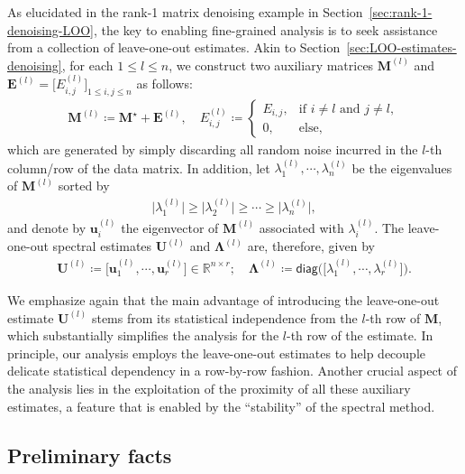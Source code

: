 As elucidated in the rank-1 matrix denoising example in Section~\ref{sec:rank-1-denoising-LOO}, the key to enabling fine-grained analysis is to seek assistance from  a collection of leave-one-out estimates.  Akin to Section~\ref{sec:LOO-estimates-denoising}, for each $1\leq l\leq n$, we construct  two auxiliary matrices  $\bm{M}^{(l)}$ and $\bm{E}^{(l)}=\big[E^{(l)}_{i,j} \big]_{1\leq i,j\leq n}$ as follows:
%
\begin{align}
\bm{M}^{(l)}\coloneqq\bm{M}^{\star}+\bm{E}^{(l)},
\quad
E_{i,j}^{(l)}  \coloneqq
\begin{cases}
E_{i,j}, & \text{if }i\neq l\text{ and }j\neq l,\\
0, & \text{else},
\end{cases}
\label{eq:Ml-construction-general}
\end{align}
%
which are generated by simply discarding all random noise incurred in the $l$-th column/row of the data matrix.
In addition, let $\lambda_1^{(l)},\cdots,\lambda_n^{(l)}$ be the eigenvalues of $\bm{M}^{(l)}$ sorted by
%
\begin{align}
	\big|\lambda_1^{(l)}\big| \geq \big|\lambda_2^{(l)}\big| \geq \cdots \geq \big| \lambda_{n}^{(l)} \big| ,
\end{align}
%
and denote by $\bm{u}_{i}^{(l)}$ the eigenvector of $\bm{M}^{(l)}$  associated with $\lambda_i^{(l)}$. The leave-one-out spectral estimates $\bm{U}^{(l)}$ and $\bm{\Lambda}^{(l)}$ are, therefore, given by
%
\begin{align}
	\bm{U}^{(l)}\coloneqq\big[\bm{u}_{1}^{(l)},\cdots,\bm{u}_{r}^{(l)}\big]\in\mathbb{R}^{n\times r};
	\quad
	\bm{\Lambda}^{(l)}\coloneqq\mathsf{diag}\big(\big[\lambda_{1}^{(l)},\cdots,\lambda_{r}^{(l)}\big]\big).	
\end{align}
%

We emphasize again that the main advantage of introducing the leave-one-out estimate $\bm{U}^{(l)}$ stems from its statistical independence from the $l$-th row of $\bm{M}$, which substantially simplifies the analysis for the $l$-th row of the estimate.
In principle, our analysis employs the leave-one-out estimates
to help decouple delicate statistical dependency  in a row-by-row fashion. Another crucial aspect of the analysis lies in the exploitation of the proximity of all these auxiliary estimates, a feature that is enabled by the ``stability'' of the spectral method.





\subsection{Preliminary facts}
\label{sec:preliminary-facts-Linf-general}

